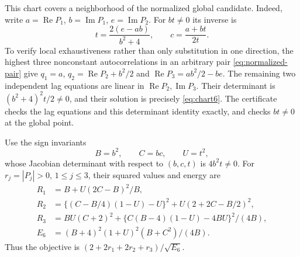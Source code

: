 \documentclass[11pt]{article}
\DeclareMathOperator{\Rea}{Re}
\DeclareMathOperator{\Ima}{Im}
\begin{document}
This chart covers a neighborhood of the normalized global candidate.
Indeed, write $a=\Rea P_1$, $b=\Ima P_1$, $e=\Ima P_2$.
For $bt\ne0$ its inverse is
\begin{equation}\label{eq:inverse6}
 t=\frac{2(e-ab)}{b^2+4},\qquad c=\frac{a+bt}{2t}.
\end{equation}
To verify local exhaustiveness rather than only substitution in one
direction, the highest three nonconstant autocorrelations in an arbitrary
pair \eqref{eq:normalized-pair} give
$q_1=a$, $q_2=\Rea P_2+b^2/2$ and
$\Rea P_3=ab^2/2-be$. The remaining two independent lag equations are
linear in $\Rea P_2,\Ima P_3$. Their determinant is
$(b^2+4)^2t/2\ne0$, and their solution is precisely
\eqref{eq:chart6}. The certificate checks the lag equations and this
determinant identity exactly, and checks $bt\ne0$ at the global point.

Use the sign invariants
\[
 B=b^2,\qquad C=bc,\qquad U=t^2,
\]
whose Jacobian determinant with respect to $(b,c,t)$ is $4b^2t\ne0$.
For $r_j=|P_j|>0$, $1\le j\le3$, their squared values and energy are
\begin{align}\label{eq:R6}
 R_1&=B+U(2C-B)^2/B,\nonumber\\
 R_2&=\{(C-B/4)(1-U)-U\}^2+U(2+2C-B/2)^2,\\
 R_3&=BU(C+2)^2+\{C(B-4)(1-U)-4BU\}^2/(4B),\nonumber\\
 E_6&=(B+4)^2(1+U)^2(B+C^2)/(4B).\nonumber
\end{align}
Thus the objective is $(2+2r_1+2r_2+r_3)/\sqrt{E_6}$.
\end{document}
